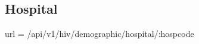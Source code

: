         \subsection{Hospital}
            url = /api/v1/hiv/demographic/hospital/:hospcode
            
            
       
        
        
